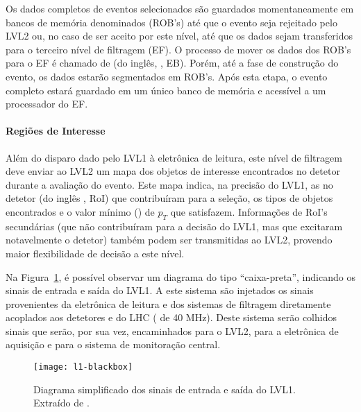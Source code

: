 Os dados completos de eventos selecionados são guardados momentaneamente em
bancos de memória denominados  (ROB's) até que o
evento seja rejeitado pelo LVL2 ou, no caso de ser aceito por este nível, até
que os dados sejam transferidos para o terceiro nível de filtragem (EF). O
processo de mover os dados dos ROB's para o EF é chamado de  (do inglês, , EB). Porém, até a fase de
construção do evento, os dados estarão segmentados em ROB's. Após esta etapa,
o evento completo estará guardado em um único banco de memória e acessível a
um processador do EF.

\paragraph{Regiões de Interesse} Além do disparo dado pelo LVL1 à eletrônica de
leitura, este nível de filtragem deve enviar ao LVL2 um mapa dos objetos de
interesse encontrados no detetor durante a avaliação do evento. Este mapa
indica, na precisão do LVL1, as  no detetor (do inglês
, RoI) que contribuíram para a seleção, os tipos
de objetos encontrados e o valor mínimo () de $p_T$ que
satisfazem. Informações de RoI's secundárias (que não contribuíram para a
decisão do LVL1, mas que excitaram notavelmente o detetor) também podem ser
transmitidas ao LVL2, provendo maior flexibilidade de decisão a este nível.

Na Figura~\ref{fig:l1-context}, é possível observar um diagrama do tipo
``caixa-preta'', indicando os sinais de entrada e saída do LVL1. A este
sistema são injetados os sinais provenientes da eletrônica de leitura e dos
sistemas de filtragem diretamente acoplados aos detetores e do LHC
( de 40 MHz). Deste sistema serão colhidos sinais que serão, por
sua vez, encaminhados para o LVL2, para a eletrônica de aquisição e para o
sistema de monitoração central.

\begin{figure}
\begin{center}
\texttt{[image: l1-blackbox]}
\end{center}
\caption[Diagrama simplificado dos sinais de entrada e saída do
LVL1.]{Diagrama simplificado dos sinais de entrada e saída do LVL1. Extraído
de \cite{hlt-tdr}.}
\label{fig:l1-context}
\end{figure}

